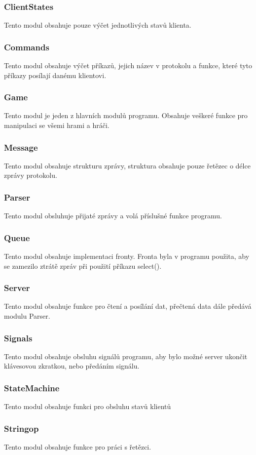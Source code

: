 \documentclass[12pt]{article}
\begin{document}
\subsubsection{ClientStates}
Tento modul obsahuje pouze výčet jednotlivých stavů klienta.
\subsubsection{Commands}
Tento modul obsahuje výčet příkazů, jejich název v protokolu a funkce, které tyto příkazy posílají danému klientovi.
\subsubsection{Game}
Tento modul je jeden z hlavních modulů programu. Obsahuje veškeré funkce pro manipulaci se všemi hrami a hráči. 
\subsubsection{Message}
Tento modul obsahuje strukturu zprávy, struktura obsahuje pouze řetězec o délce zprávy protokolu.
\subsubsection{Parser}
Tento modul obsluhuje přijaté zprávy a volá příslušné funkce programu.
\subsubsection{Queue}
Tento modul obsahuje implementaci fronty. Fronta byla v programu použita, aby se zamezilo ztrátě zpráv při použití příkazu select().
\subsubsection{Server}
Tento modul obsahuje funkce pro čtení a posílání dat, přečtená data dále předává modulu Parser.
\subsubsection{Signals}
Tento modul obsahuje obsluhu signálů programu, aby bylo možné server ukončit klávesovou zkratkou, nebo předáním signálu.
\subsubsection{StateMachine}
Tento modul obsahuje funkci pro obsluhu stavů klientů
\subsubsection{Stringop}
Tento modul obsahuje funkce pro práci s řetězci.
\end{document}

